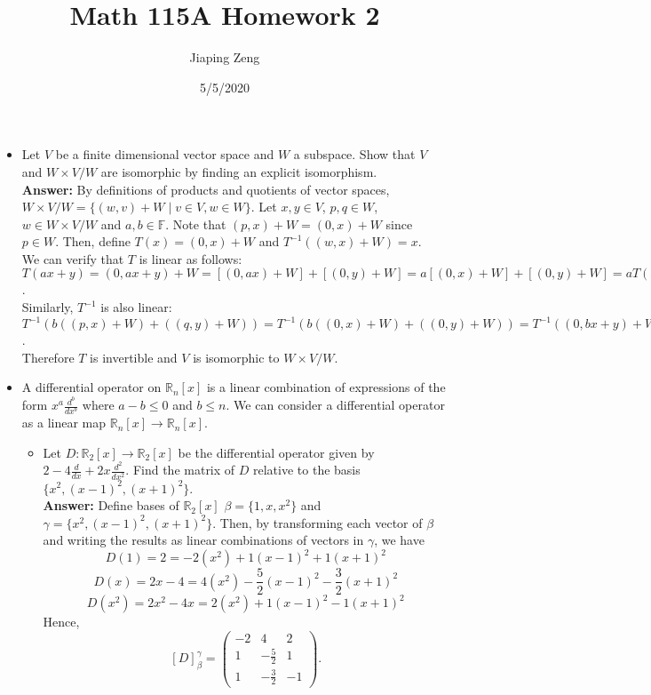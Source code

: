 \documentclass{article}
\title{Math 115A Homework 2}
\date{5/5/2020}
\author{Jiaping Zeng}
\begin{document}
\maketitle

\begin{itemize}
	\item [2.] Let $V$ be a finite dimensional vector space and $W$ a subspace. Show that $V$ and $W\times V/W$ are isomorphic by finding an explicit isomorphism.\\
	      \textbf{Answer: } By definitions of products and quotients of vector spaces, $W\times V/W=\{(w,v)+W\mid v\in V, w\in W\}$. Let $x,y\in V$, $p,q\in W$, $w\in W\times V/W$ and $a,b\in \mathbb{F}$. Note that $(p,x)+W=(0,x)+W$ since $p\in W$. Then, define $T(x)=(0,x)+W$ and $T^{-1}((w,x)+W)=x$.\\We can verify that $T$ is linear as follows: $T(ax+y)=(0,ax+y)+W=[(0,ax)+W]+[(0,y)+W]=a[(0,x)+W]+[(0,y)+W]=aT(x)+T(y)$.\\Similarly, $T^{-1}$ is also linear: $T^{-1}(b((p,x)+W)+((q,y)+W))=T^{-1}(b((0,x)+W)+((0,y)+W))=T^{-1}((0,bx+y)+W)=bx+y=bT^{-1}((p,x)+W)+T^{-1}((q,y)+W)$.\\Therefore $T$ is invertible and $V$ is isomorphic to $W\times V/W$.
	\item [5.] A differential operator on $\mathbb{R}_n[x]$ is a linear combination of expressions of the form $x^a\frac{d^b}{dx^b}$ where $a-b \leq 0$ and $b \leq n$. We can consider a differential operator as a linear map $\mathbb{R}_n[x]\rightarrow\mathbb{R}_n[x]$.
	      \begin{itemize}
		      \item [(a)] Let $D:\mathbb{R}_2[x]\rightarrow\mathbb{R}_2[x]$ be the differential operator given by $2-4\frac{d}{dx}+2x\frac{d^2}{dx^2}$. Find the matrix of $D$ relative to the basis $\{x^2, (x-1)^2, (x+1)^2\}$.\\
		            \textbf{Answer: } Define bases of $\mathbb{R}_2[x]$ $\beta=\{1,x,x^2\}$ and $\gamma=\{x^2,(x-1)^2,(x+1)^2\}$. Then, by transforming each vector of $\beta$ and writing the results as linear combinations of vectors in $\gamma$, we have \[D(1)=2=-2(x^2)+1(x-1)^2+1(x+1)^2\]\[D(x)=2x-4=4(x^2)-\frac{5}{2}(x-1)^2-\frac{3}{2}(x+1)^2\]\[D(x^2)=2x^2-4x=2(x^2)+1(x-1)^2-1(x+1)^2\]Hence, \[[D]_{\beta}^{\gamma}=\begin{pmatrix}-2&4&2\\1&-\frac{5}{2}&1\\1&-\frac{3}{2}&-1\end{pmatrix}.\]

\end{itemize}
\end{itemize}
\end{document}

